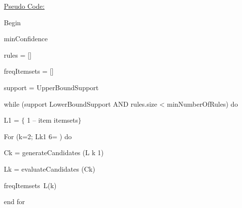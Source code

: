 \documentclass[12pt]{article}
\renewcommand{\_}{\kern-1.5pt\textunderscore\kern-1.5pt}
\begin{document}
\vspace{\baselineskip}

\vspace{\baselineskip}
{\fontsize{14pt}{16.8pt}\selectfont \uline{Pseudo Code:}\par}\par

Begin\par

minConfidence\par

rules = []\par

freqItemsets = []\par

support = UpperBoundSupport\par

while (support LowerBoundSupport AND rules.size < minNumberOfRules) do\par

\begin{adjustwidth}{0.5in}{0.0in}
L1 = $ \{ $ 1 – item itemsets$ \} $ \par

\end{adjustwidth}

\begin{adjustwidth}{0.5in}{0.0in}
For (k=2; Lk1 6= ) do\par

\end{adjustwidth}

\begin{adjustwidth}{0.5in}{0.0in}
Ck = generateCandidates (L k 1)\par

\end{adjustwidth}

\begin{adjustwidth}{0.5in}{0.0in}
\tab Lk = evaluateCandidates (Ck)\par

\end{adjustwidth}

\begin{adjustwidth}{0.5in}{0.0in}
freqItemsets\  L(k)\par

\end{adjustwidth}

\begin{adjustwidth}{0.5in}{0.0in}
end for\par

\end{adjustwidth}
\end{document}
